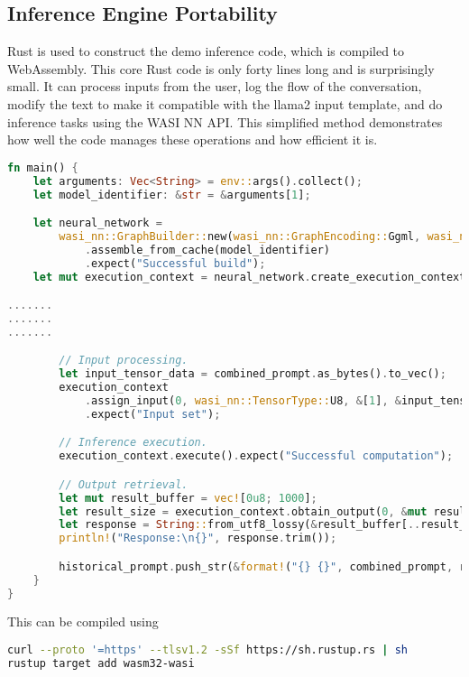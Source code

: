\subsection{Inference Engine Portability}

Rust is used to construct the demo inference code, which is compiled to WebAssembly. This core Rust code is only forty lines long and is surprisingly small. It can process inputs from the user, log the flow of the conversation, modify the text to make it compatible with the llama2 input template, and do inference tasks using the WASI NN API. This simplified method demonstrates how well the code manages these operations and how efficient it is.

\begin{lstlisting}[caption={Rust Inference}, style=boxed, breaklines, language=Rust, label=infer rust, basicstyle=\tiny]
fn main() {
    let arguments: Vec<String> = env::args().collect();
    let model_identifier: &str = &arguments[1];

    let neural_network =
        wasi_nn::GraphBuilder::new(wasi_nn::GraphEncoding::Ggml, wasi_nn::ExecutionTarget::AUTO)
            .assemble_from_cache(model_identifier)
            .expect("Successful build");
    let mut execution_context = neural_network.create_execution_context().expect("Context initialization");

.......
.......
.......

        // Input processing.
        let input_tensor_data = combined_prompt.as_bytes().to_vec();
        execution_context
            .assign_input(0, wasi_nn::TensorType::U8, &[1], &input_tensor_data)
            .expect("Input set");

        // Inference execution.
        execution_context.execute().expect("Successful computation");

        // Output retrieval.
        let mut result_buffer = vec![0u8; 1000];
        let result_size = execution_context.obtain_output(0, &mut result_buffer).expect("Output retrieval");
        let response = String::from_utf8_lossy(&result_buffer[..result_size]).to_string();
        println!("Response:\n{}", response.trim());

        historical_prompt.push_str(&format!("{} {}", combined_prompt, response.trim()));
    }
}
\end{lstlisting}

This can be compiled using

\begin{lstlisting}[caption={Rust Compile},breaklines, language=bash, label=rust compile]
curl --proto '=https' --tlsv1.2 -sSf https://sh.rustup.rs | sh
rustup target add wasm32-wasi
\end{lstlisting}

